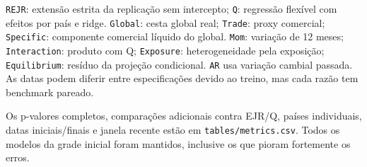 \documentclass[11pt,a4paper]{article}
\begin{document}
\texttt{REJR}: extensão estrita da replicação sem intercepto; \texttt{Q}: regressão flexível com efeitos por país e ridge. \texttt{Global}: cesta global real; \texttt{Trade}: proxy comercial; \texttt{Specific}: componente comercial líquido do global. \texttt{Mom}: variação de 12 meses; \texttt{Interaction}: produto com Q; \texttt{Exposure}: heterogeneidade pela exposição; \texttt{Equilibrium}: resíduo da projeção condicional. \texttt{AR} usa variação cambial passada. As datas podem diferir entre especificações devido ao treino, mas cada razão tem benchmark pareado.

Os p-valores completos, comparações adicionais contra EJR/Q, países individuais, datas iniciais/finais e janela recente estão em \texttt{tables/metrics.csv}. Todos os modelos da grade inicial foram mantidos, inclusive os que pioram fortemente os erros.

\clearpage
\end{document}
